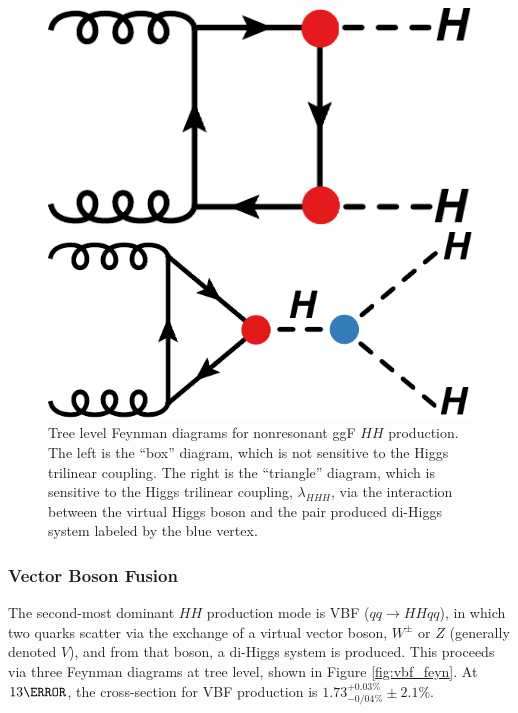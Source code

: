 \begin{figure}[!thp]
    \centering
    \begin{minipage}[c]{.40\textwidth}
        \includegraphics[width=\textwidth]{chapters/chapter1_theory/images/hh_box.pdf}
    \end{minipage}
    \hspace{0.09\textwidth}
    \begin{minipage}[c]{.40\textwidth}
        \includegraphics[width=\textwidth]{chapters/chapter1_theory/images/hh_triangle.pdf}
    \end{minipage}

    \caption[Tree level Feynman diagrams for nonresonant \gls{ggF} $HH$ production.]{Tree level Feynman diagrams for nonresonant \gls{ggF} $HH$ production. The left is the ``box'' diagram, which is not sensitive to the Higgs trilinear coupling. The right is the ``triangle'' diagram, which is sensitive to the Higgs trilinear coupling, $\lambda_{HHH}$, via the interaction between the virtual Higgs boson and the pair produced di-Higgs system labeled by the blue vertex.}
    \label{fig:ggf_feyn}
\end{figure}

\subsubsection{Vector Boson Fusion} \label{sssec:vbfHH}
The second-most dominant $HH$ production mode is \gls{VBF} ($qq \rightarrow HHqq$), in which two quarks scatter via the exchange of a virtual vector boson, $W^\pm$ or $Z$ (generally denoted $V$), and from that boson, a di-Higgs system is produced. This proceeds via three Feynman diagrams at tree level, shown in Figure \ref{fig:vbf_feyn}. At $\unit{13}{\TeV}$, the cross-section for \gls{VBF} production is $1.73^{+0.03\%}_{-0/04\%} \pm 2.1\%$\cite{hh-crosssections}.

